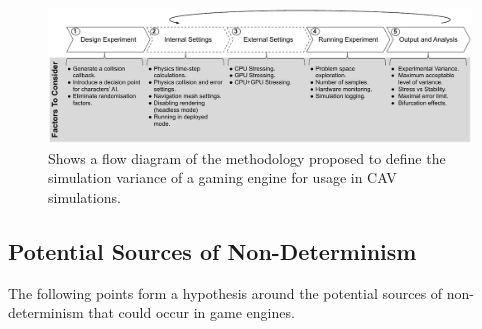 \documentclass[letterpaper, 10 pt, journal, twoside]{IEEEtran}
\begin{document}
\begin{figure}[b]
    \centering
    \includegraphics[width=0.99\linewidth]{Other/Figures/MethodologyDiagram.pdf}
    \caption{Shows a flow diagram of the methodology proposed to define the simulation variance of a gaming engine for usage in CAV simulations.}

    \label{method_diagram}
\end{figure}

\subsection{Potential Sources of Non-Determinism} \label{s:nondeterminisimSources}

The following points form a hypothesis around the potential sources of non-determinism that could occur in game engines. \\\\
\end{document}
